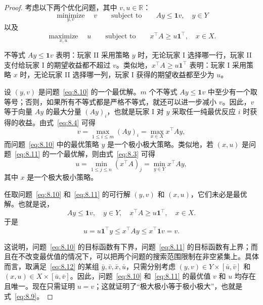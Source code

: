 \begin{proof}
考虑以下两个优化问题，其中 \(v,u\in\mathbb{R}\)：
\begin{equation}\label{eq:8.10}
\underset{y,v}{\operatorname{minimize}}\quad v
\qquad\text{subject to}\qquad
Ay\leq\mathbf{1}v,\quad y\in Y
\end{equation}
以及
\begin{equation}\label{eq:8.11}
\underset{x,u}{\operatorname{maximize}}\quad u
\qquad\text{subject to}\qquad
x^{\top}A\geq u\mathbf{1}^{\top},\quad x\in X.
\end{equation}

不等式 \(Ay\leq\mathbf{1}v\) 表明：玩家 II 采用策略 \(y\) 时，无论玩家 I 选择哪一行，玩家 II 支付给玩家 I 的期望收益都不超过 \(v\)。类似地，\(x^{\top}A\geq u\mathbf{1}^{\top}\) 表明：玩家 I 采用策略 \(x\) 时，无论玩家 II 选择哪一列，玩家 I 获得的期望收益都至少为 \(u\)。

设 \((y,v)\) 是问题~\eqref{eq:8.10} 的一个最优解。\(m\) 个不等式 \(Ay\leq\mathbf{1}v\) 中至少有一个取等号；否则，如果所有不等式都是严格不等式，就还可以进一步减小 \(v\)。因此，\(v\) 等于向量 \(Ay\) 的最大分量 \((Ay)_i\)，也就是玩家 I 对 \(y\) 采取任一纯最优反应 \(i\) 时获得的收益。由式~\eqref{eq:8.4} 可得
\[
v=\max_{1\leq i\leq m}(Ay)_i
=\max_{x\in X}x^{\top}Ay,
\]
而问题~\eqref{eq:8.10} 中的最优策略 \(y\) 是一个极小极大策略。类似地，若 \((x,u)\) 是问题~\eqref{eq:8.11} 的一个最优解，则由式~\eqref{eq:8.3} 可得
\[
u=\min_{1\leq j\leq n}(x^{\top}A)_j
=\min_{y\in Y}x^{\top}Ay,
\]
其中 \(x\) 是一个极大极小策略。

任取问题~\eqref{eq:8.10} 和~\eqref{eq:8.11} 的可行解 \((y,v)\) 和 \((x,u)\)，它们未必是最优解。也就是说，
\begin{equation}\label{eq:8.12}
Ay\leq\mathbf{1}v,\quad y\in Y,\quad
x^{\top}A\geq u\mathbf{1}^{\top},\quad x\in X.
\end{equation}
于是
\begin{equation}\label{eq:8.13}
u=u\mathbf{1}^{\top}y
\leq x^{\top}Ay
\leq x^{\top}\mathbf{1}v=v.
\end{equation}

这说明，问题~\eqref{eq:8.10} 的目标函数有下界，问题~\eqref{eq:8.11} 的目标函数有上界；而且在不改变最优值的情况下，可以把两个问题的搜索范围限制在非空紧集上。具体而言，取满足~\eqref{eq:8.12} 的某组 \(\bar{y},\bar{v},\bar{x},\bar{u}\)，只需分别考虑 \((y,v)\in Y\times[\bar{u},\bar{v}]\) 和 \((x,u)\in X\times[\bar{u},\bar{v}]\)。因此，问题~\eqref{eq:8.10} 和~\eqref{eq:8.11} 的最优值 \(v\) 和 \(u\) 均存在且唯一。现在只需证明 \(u=v\)；这就证明了“极大极小等于极小极大”，也就是式~\eqref{eq:8.9}。


\end{proof}
